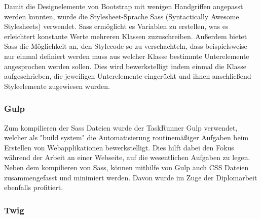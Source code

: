 Damit die Designelemente von Bootstrap mit wenigen Handgriffen angepasst werden konnten, wurde die Stylesheet-Sprache {Sass\cite{sass}} (Syntactically Awesome Stylesheets) verwendet. Sass ermöglicht es Variablen zu erstellen, was es erleichtert konstante Werte mehreren Klassen zuzuschreiben. Außerdem bietet Sass die Möglichkeit an, den Stylecode so zu verschachteln, dass beispielsweise nur einmal definiert werden muss aus welcher Klasse bestimmte Unterelemente angesprochen werden sollen. Dies wird bewerkstelligt indem einmal die Klasse aufgeschrieben, die jeweiligen Unterelemente eingerückt und ihnen anschließend Styleelemente zugewiesen wurden.

    \subsubsection{Gulp}

Zum kompilieren der Sass Dateien wurde der TaskRunner {Gulp\cite{gulp}} verwendet, welcher als "build system" die Automatisierung routinemäßiger Aufgaben beim Erstellen von Webapplikationen bewerkstelligt. Dies hilft dabei den Fokus während der Arbeit an einer Webseite, auf die wesentlichen Aufgaben zu legen. Neben dem kompilieren von Sass, können mithilfe von Gulp auch CSS Dateien zusammengefasst und minimiert werden. Davon wurde im Zuge der Diplomarbeit ebenfalls profitiert.

    \subsubsection{Twig}


